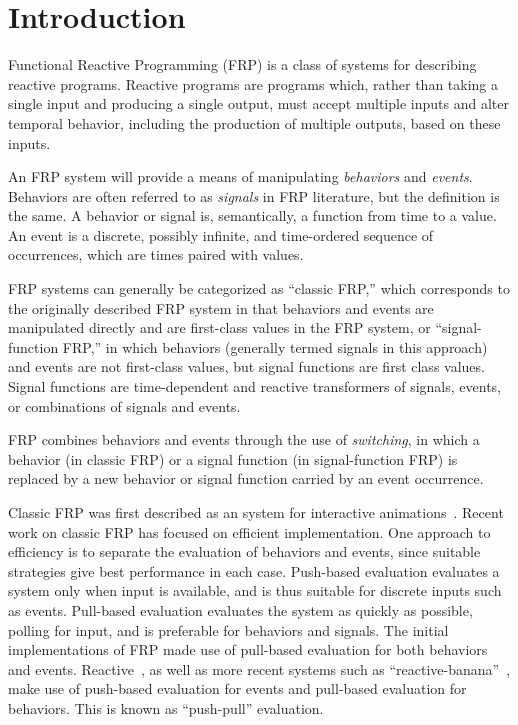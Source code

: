 \section{Introduction}
\label{section:Introduction}

Functional Reactive Programming (FRP) is a class of systems for describing
reactive programs. Reactive programs are programs which, rather than taking
a single input and producing a single output, must accept multiple inputs and 
alter temporal behavior, including the production of multiple outputs, based
on these inputs.

An FRP system will provide a means of manipulating {\em behaviors} and
{\em events}. Behaviors are often referred to as {\em signals} in FRP literature,
but the definition is the same. A behavior or signal is, semantically, a
function from time to a value. An event is a discrete, possibly infinite, and 
time-ordered sequence of occurrences, which are times paired with values.

FRP systems can generally be categorized as ``classic FRP,'' 
which corresponds to the originally described FRP system in that behaviors
and events are manipulated directly and are first-class values in the FRP
system, or ``signal-function FRP,'' in which behaviors (generally termed
signals in this approach) and events are not first-class values, but signal
functions are first class values. Signal functions are time-dependent and
reactive transformers of signals, events, or combinations of signals and events.

FRP combines behaviors and events through the use of {\em switching}, in which
a behavior (in classic FRP) or a signal function (in signal-function FRP) is
replaced by a new behavior or signal function carried by an event occurrence.

Classic FRP was first described as an system for interactive animations~\cite{Elliott1997}.
Recent work on classic FRP has focused on efficient implementation. One approach to
efficiency is to separate the evaluation of behaviors and events, since suitable 
strategies give best performance in each case. Push-based evaluation evaluates a
system only when input is available, and is thus suitable for discrete inputs
such as events. Pull-based evaluation evaluates the system as quickly as
possible, polling for input, and is preferable for behaviors and signals.
The initial implementations of FRP made use of pull-based evaluation for both
behaviors and events. Reactive~\cite{Elliott2009}, as well as more recent systems such as
``reactive-banana''~\cite{Apfelmus}, make use of push-based evaluation for
events and pull-based evaluation for behaviors. This is known as ``push-pull''
evaluation.

